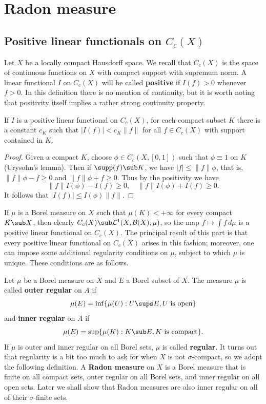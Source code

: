 \chapter{Radon measure}
\section{Positive linear functionals on \boldmath$C_c(X)$}
Let $X$ be a locally compact Hausdorff space. We recall that $C_c(X)$ is the space of continuous functions on $X$ with compact support with supremum norm. A linear functional $I$ on $C_c(X)$ will be called \textbf{positive} if $I(f)>0$ whenever $f>0$. In this definition there is no mention of continuity, but it is worth noting that positivity itself implies a rather strong continuity property.
\begin{proposition}
If $I$ is a positive linear functional on $C_c(X)$, for each compact subset $K$ there is a constant $c_K$ such that $|I(f)|<c_K\|f\|$ for all $f\in C_c(X)$ with support contained in $K$.
\end{proposition}
\begin{proof}
Given a compact $K$, choose $\phi\in C_c(X,[0,1])$ such that $\phi\equiv 1$ on $K$ (Urysohn's lemma). Then if $\supp(f)\sub K$, we have $|f|\leq\|f\|\phi$, that is, $\|f\|\phi-f\geq 0$ and $\|f\|\phi+f\geq 0$. Thus by the positivity we have
\[\|f\|I(\phi)-I(f)\geq 0,\quad \|f\|I(\phi)+I(f)\geq 0.\]
It follows that $|I(f)|\leq I(\phi)\|f\|$.
\end{proof}
If $\mu$ is a Borel measure on $X$ such that $\mu(K)<+\infty$ for every compact $K\sub X$, then clearly $C_c(X)\sub\mathcal{L}^1(X,\mathcal{B}(X),\mu)$, so the map $f\mapsto\int f\,d\mu$ is a positive linear functional on $C_c(X)$. The principal result of this part is that every positive linear functional on $C_c(X)$ arises in this fashion; moreover, one can impose some additional regularity conditions on $\mu$, subject to which $\mu$ is unique. These conditions are as follows.\par
Let $\mu$ be a Borel measure on $X$ and $E$ a Borel subset of $X$. The measure $\mu$ is called \textbf{outer regular} on $A$ if
\[\mu(E)=\inf\{\mu(U):U\sups E,\text{$U$ is open}\}\]
and \textbf{inner regular} on $A$ if
\[\mu(E)=\sup\{\mu(K):K\sub E,\text{$K$ is compact}\}.\]
If $\mu$ is outer and inner regular on all Borel sets, $\mu$ is called \textbf{regular}. It turns out that regularity is a bit too much to ask for when $X$ is not $\sigma$-compact, so we adopt the following definition. A \textbf{Radon measure} on $X$ is a Borel measure that is finite on all compact sets, outer regular on all Borel sets, and inner regular on all open sets. Later we shall show that Radon measures are also inner regular on all of their $\sigma$-finite sets.\par
